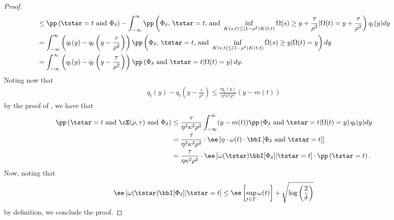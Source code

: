 \begin{proof}
\begin{align}
        &\leq \pp\left( \tstar = t  \text{ and } \Phi_\delta \right)  - \int_{-\infty}^\infty \pp\left( \Phi_\delta, \, \tstar=t \text{, and } \inf_{K(s,t) \leq (1- \rho^2) K(t,t)} \Omega(s) \geq y + \frac{\tau}{\rho^2} | \Omega(t) = y + \frac{\tau}{\rho^2} \right) q_t(y)d y \\
        &= \int_{-\infty}^\infty \left( q_t(y) - q_t\left( y - \frac{\tau}{\rho^2} \right) \right) \pp\left( \Phi_\delta, \, \tstar=t \text{, and } \inf_{K(s,t) \leq (1- \rho^2) K(t,t)} \Omega(s) \geq y  | \Omega(t) = y  \right) d y \\
        &= \int_{-\infty}^\infty \left( q_t(y) - q_t\left( y - \frac{\tau}{\rho^2} \right) \right) \pp\left( \Phi_\delta \text{ and } \tstar=t  | \Omega(t) = y  \right) d y.
    \end{align}
    Noting now that
    \begin{align}
        q_t(y) - q_t\left( y - \frac{\tau}{\rho^2} \right) \leq \frac{\tau q_t(y)}{ \eta^2 \kappa^2  \rho^2} (y - m(t))
    \end{align}
    by the proof of \citet[Theorem 5]{block2024oracle}, we have that
    \begin{align}
        \pp\left( \tstar = t \text{ and } \cE(\rho, \tau) \text{ and } \Phi_\delta \right) &\leq \frac{\tau }{ \eta^2 \kappa^2  \rho^2} \int_{-\infty}^\infty (y - m(t)) \pp\left( \Phi_\delta \text{ and } \tstar=t  | \Omega(t) = y  \right) q_t(y) d y \\
        &= \frac{\tau }{ \eta^2 \kappa^2  \rho^2} \cdot  \ee\left[ \eta  \cdot \omega(t) \cdot \bbI\left[ \Phi_\delta \text{ and } \tstar = t \right] \right] \\
        &= \frac{\tau }{ \eta \kappa^2  \rho^2} \cdot \ee\left[ \omega(\tstar) \bbI[\Phi_\delta] | \tstar = t \right] \cdot \pp\left( \tstar = t \right).
    \end{align}
    Now, noting that 
    \begin{align}
        \ee\left[ \omega(\tstar) \bbI[\Phi_\delta] | \tstar = t \right]  \leq \ee\left[ \sup_{t \in T} \omega(t) \right] + \sqrt{\log\left( \frac 2\delta \right)}
    \end{align}
    by definition, we conclude the proof.
\end{proof}


